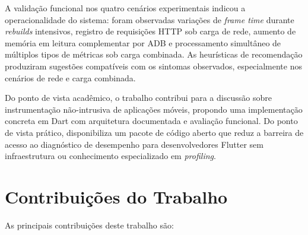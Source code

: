A validação funcional nos quatro cenários experimentais indicou a operacionalidade do sistema: foram observadas variações de \textit{frame time} durante \textit{rebuilds} intensivos, registro de requisições HTTP sob carga de rede, aumento de memória em leitura complementar por ADB e processamento simultâneo de múltiplos tipos de métricas sob carga combinada. As heurísticas de recomendação produziram sugestões compatíveis com os sintomas observados, especialmente nos cenários de rede e carga combinada.

Do ponto de vista acadêmico, o trabalho contribui para a discussão sobre instrumentação não-intrusiva de aplicações móveis, propondo uma implementação concreta em Dart com arquitetura documentada e avaliação funcional. Do ponto de vista prático, disponibiliza um pacote de código aberto que reduz a barreira de acesso ao diagnóstico de desempenho para desenvolvedores Flutter sem infraestrutura ou conhecimento especializado em \textit{profiling}.

\section{Contribuições do Trabalho}

As principais contribuições deste trabalho são:

